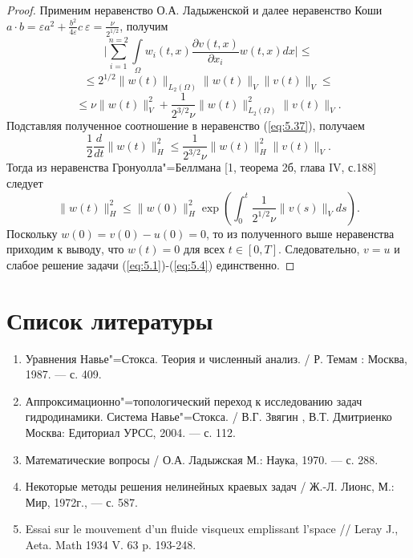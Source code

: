 \begin{proof}
    Применим неравенство О.А. Ладыженской и далее неравенство Коши \linebreak
    $a\cdot b=\varepsilon a^2+\frac{b^2}{4\varepsilon}c \ \varepsilon=\frac{\nu}{2^{1/2}}$, получим
    $$\bigg|\sum_{i=1}^{n=2}\int\limits_\Omega w_i(t, x)\frac{\partial v(t, x)}{\partial x_i}w(t, x)dx\bigg|\le$$
    $$\le 2^{1/2}\| w(t)\|_{L_2(\Omega)}\| w(t)\|_V\| v(t)\|_V\le$$
    $$\le \nu\| w(t)\|_V^2+\frac{1}{2^{3/2}\nu}\| w(t)\|_{L_2(\Omega)}^2\| v(t)\|_V.$$
    Подставляя полученное соотношение в неравенство (\ref{eq:5.37}), получаем
    $$\frac{1}{2}\frac{d}{dt}\| w(t)\|_H^2\le\frac{1}{2^{3/2}\nu}\| w(t)\|_H^2\| v(t)\|_V.$$
    Тогда из неравенства Гронуолла"=Беллмана [1, теорема 2б, глава IV, с.188] следует
    $$\| w(t)\|_H^2\le\| w(0)\|_H^2\exp\left(\int_0^t\frac{1}{2^{1/2}\nu}\| v(s)\|_Vds\right).$$
    Поскольку $w(0) = v(0)- u(0) = 0$, то из полученного выше неравенства приходим к выводу,
    что $w(t)=0$ для всех $t\in[0, T]$. Следовательно, $v=u$ и слабое решение задачи (\ref{eq:5.1})-(\ref{eq:5.4}) единственно.
\end{proof}


\clearpage
\section*{Список литературы}
\begin{enumerate} 
    \item Уравнения Навье"=Стокса. Теория и численный анализ. / Р. Темам : Москва, 1987. — с. 409.
    \item  Аппроксимационно"=топологический переход к исследованию задач гидродинамики. 
    Система Навье"=Стокса. / В.Г. Звягин , В.Т. Дмитриенко  Москва: Едиториал УРСС, 2004. — с. 112.
    \item  Математические вопросы / О.А. Ладыжская  М.: Наука, 1970. — с. 288.
    \item Некоторые методы решения нелинейных краевых задач / Ж.-Л. Лионс, М.: Мир, 1972г., — с. 587.
    \item Essai sur le mouvement d'un fluide visqueux emplissant l'space // \linebreak Leray J., Aeta. 
    Math 1934 V. 63 p. 193-248.
\end{enumerate}